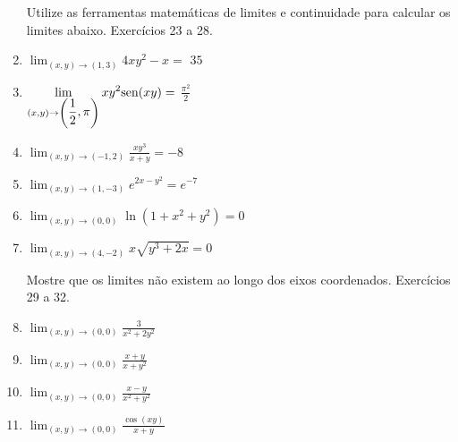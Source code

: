 \documentclass[oneside,a4paper,12pt]{article}
\newcommand{\sen}{{\rm sen}}
\newcommand{\limm}{\displaystyle \lim}
\newcommand{\limmzero}{\displaystyle \lim_{(x,y)\to(0,0)}}
\begin{document}
\begin{enumerate}
   Utilize as ferramentas matemáticas de limites e continuidade para calcular os limites abaixo. Exercícios 23 a 28.
            \item $\displaystyle \lim_{(x,y)\to(1,3)}4xy^2-x=$ $35$
            \item $\limm_{(x,y)\to\left(\displaystyle\frac{1}{2},\pi\right)}xy^2\sen(xy)=$ $\displaystyle\frac{\pi^2}{2}$
            \item $\limm_{(x,y)\to(-1,2)}\displaystyle\frac{xy^3}{x+y}=-8$
            \item $\limm_{(x,y)\to(1,-3)}e^{2x-y^2}=e^{-7}$
            \item $\limm_{(x,y)\to(0,0)}\ln(1+x^2+y^2)=0$
            \item $\limm_{(x,y)\to(4,-2)}x\sqrt{y^3+2x}=0$
   
   Mostre que os limites não existem ao longo dos eixos coordenados. Exercícios 29 a 32.
            \item $\limm_{(x,y)\to(0,0)}\displaystyle\frac{3}{x^2+2y^2}$
            \item $\limmzero\frac{x+y}{x+y^2}$
            \item $\limmzero\frac{x-y}{x^2+y^2}$
            \item $\limmzero\frac{\cos(xy)}{x+y}$
    

\end{enumerate}
\end{document}
